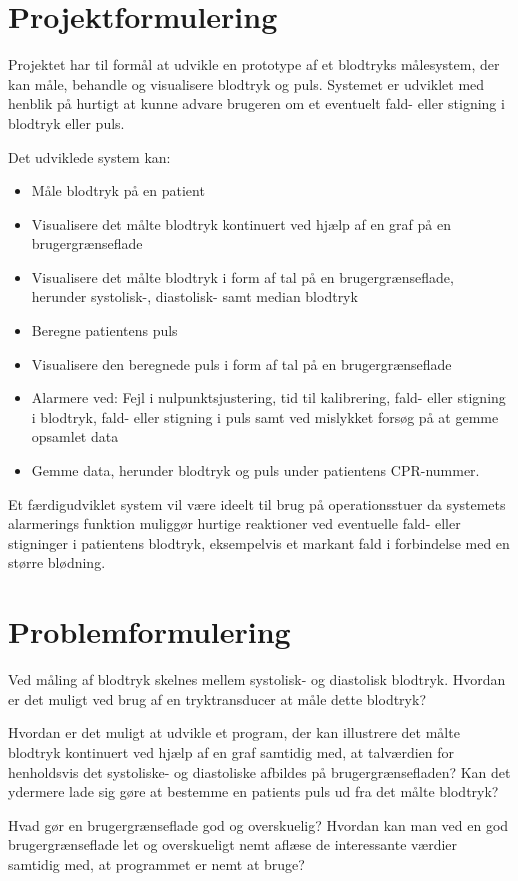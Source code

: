 \section{Projektformulering}
Projektet har til formål at udvikle en prototype af et blodtryks målesystem, der kan måle, behandle og visualisere blodtryk og puls. Systemet er udviklet med henblik på hurtigt at kunne advare brugeren om et eventuelt fald- eller stigning i blodtryk eller puls.

Det udviklede system kan:

\begin{itemize}
	\item Måle blodtryk på en patient
	\item Visualisere det målte blodtryk kontinuert ved hjælp af en graf på en brugergrænseflade
	\item Visualisere det målte blodtryk i form af tal på en brugergrænseflade, herunder systolisk-, diastolisk- samt median blodtryk
	\item Beregne patientens puls
	\item Visualisere den beregnede puls i form af tal på en brugergrænseflade
	\item Alarmere ved: Fejl i nulpunktsjustering, tid til kalibrering, fald- eller stigning i blodtryk, fald- eller stigning i puls samt ved mislykket forsøg på at gemme opsamlet data
	\item Gemme data, herunder blodtryk og puls under patientens CPR-nummer.
	
\end{itemize}

Et færdigudviklet system vil være ideelt til brug på operationsstuer da systemets alarmerings funktion muliggør hurtige reaktioner ved eventuelle fald- eller stigninger i patientens blodtryk, eksempelvis et markant fald i forbindelse med en større blødning.\\


\section{Problemformulering}

Ved måling af blodtryk skelnes mellem systolisk- og diastolisk blodtryk. Hvordan er det muligt ved brug af en tryktransducer at måle dette blodtryk?

Hvordan er det muligt at udvikle et program, der kan illustrere det målte blodtryk kontinuert ved hjælp af en graf samtidig med, at talværdien for henholdsvis det systoliske- og diastoliske afbildes på brugergrænsefladen? Kan det ydermere lade sig gøre at bestemme en patients puls ud fra det målte blodtryk?

Hvad gør en brugergrænseflade god og overskuelig? Hvordan kan man ved en god brugergrænseflade let og overskueligt nemt aflæse de interessante værdier samtidig med, at programmet er nemt at bruge?\clearpage